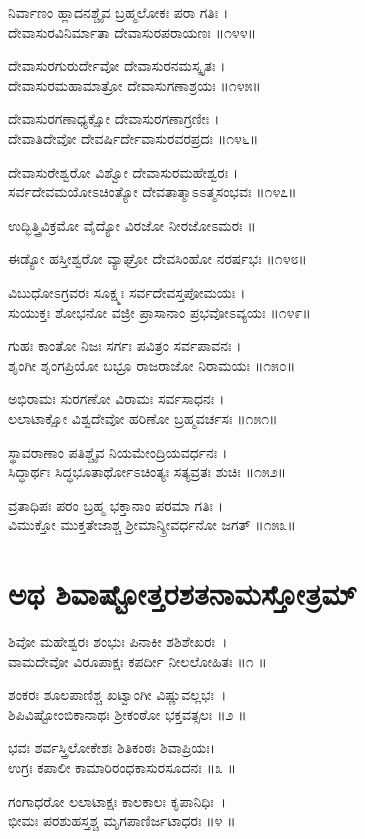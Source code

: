 ನಿರ್ವಾಣಂ ಹ್ಲಾದನಶ್ಚೈವ ಬ್ರಹ್ಮಲೋಕಃ ಪರಾ ಗತಿಃ ।\\
ದೇವಾಸುರವಿನಿರ್ಮಾತಾ ದೇವಾಸುರಪರಾಯಣಃ ॥೧೪೪॥

ದೇವಾಸುರಗುರುರ್ದೇವೋ ದೇವಾಸುರನಮಸ್ಕೃತಃ ।\\
ದೇವಾಸುರಮಹಾಮಾತ್ರೋ ದೇವಾಸುಗಣಾಶ್ರಯಃ ॥೧೪೫॥

ದೇವಾಸುರಗಣಾಧ್ಯಕ್ಷೋ ದೇವಾಸುರಗಣಾಗ್ರಣೀಃ ।\\
ದೇವಾತಿದೇವೋ ದೇವರ್ಷಿರ್ದೇವಾಸುರವರಪ್ರದಃ ॥೧೪೬॥

ದೇವಾಸುರೇಶ್ವರೋ ವಿಶ್ವೋ ದೇವಾಸುರಮಹೇಶ್ವರಃ ।\\
ಸರ್ವದೇವಮಯೋಽಚಿಂತ್ಯೋ ದೇವತಾತ್ಮಾಽಽತ್ಮಸಂಭವಃ ॥೧೪೭॥

ಉದ್ಭಿತ್ತ್ರಿವಿಕ್ರಮೋ ವೈದ್ಯೋ ವಿರಜೋ ನೀರಜೋಽಮರಃ ॥

ಈಡ್ಯೋ ಹಸ್ತೀಶ್ವರೋ ವ್ಯಾಘ್ರೋ ದೇವಸಿಂಹೋ ನರರ್ಷಭಃ ॥೧೪೮॥

ವಿಬುಧೋಽಗ್ರವರಃ ಸೂಕ್ಷ್ಮಃ ಸರ್ವದೇವಸ್ತಪೋಮಯಃ ।\\
ಸುಯುಕ್ತಃ ಶೋಭನೋ ವಜ್ರೀ ಪ್ರಾಸಾನಾಂ ಪ್ರಭವೋಽವ್ಯಯಃ ॥೧೪೯॥

ಗುಹಃ ಕಾಂತೋ ನಿಜಃ ಸರ್ಗಃ ಪವಿತ್ರಂ ಸರ್ವಪಾವನಃ ।\\
ಶೃಂಗೀ ಶೃಂಗಪ್ರಿಯೋ ಬಭ್ರೂ ರಾಜರಾಜೋ ನಿರಾಮಯಃ ॥೧೫೦॥

ಅಭಿರಾಮಃ ಸುರಗಣೋ ವಿರಾಮಃ ಸರ್ವಸಾಧನಃ ।\\
ಲಲಾಟಾಕ್ಷೋ ವಿಶ್ವದೇವೋ ಹರಿಣೋ ಬ್ರಹ್ಮವರ್ಚಸಃ ॥೧೫೧॥

ಸ್ಥಾವರಾಣಾಂ ಪತಿಶ್ಚೈವ ನಿಯಮೇಂದ್ರಿಯವರ್ಧನಃ ।\\
ಸಿದ್ಧಾರ್ಥಃ ಸಿದ್ಧಭೂತಾರ್ಥೋಽಚಿಂತ್ಯಃ ಸತ್ಯವ್ರತಃ ಶುಚಿಃ ॥೧೫೨॥

ವ್ರತಾಧಿಪಃ ಪರಂ ಬ್ರಹ್ಮ ಭಕ್ತಾನಾಂ ಪರಮಾ ಗತಿಃ ।\\
ವಿಮುಕ್ತೋ ಮುಕ್ತತೇಜಾಶ್ಚ ಶ್ರೀಮಾನ್ಶ್ರೀವರ್ಧನೋ ಜಗತ್ ॥೧೫೩॥
\section{ಅಥ ಶಿವಾಷ್ಟೋತ್ತರಶತನಾಮಸ್ತೋತ್ರಮ್ }
ಶಿವೋ ಮಹೇಶ್ವರಃ ಶಂಭುಃ ಪಿನಾಕೀ ಶಶಿಶೇಖರಃ~।\\
ವಾಮದೇವೋ ವಿರೂಪಾಕ್ಷಃ ಕಪರ್ದೀ ನೀಲಲೋಹಿತಃ ॥೧ ॥

ಶಂಕರಃ ಶೂಲಪಾಣಿಶ್ಚ ಖಟ್ವಾಂಗೀ ವಿಷ್ಣುವಲ್ಲಭಃ~।\\
ಶಿಪಿವಿಷ್ಟೋಂಬಿಕಾನಾಥಃ ಶ್ರೀಕಂಠೋ ಭಕ್ತವತ್ಸಲಃ ॥೨ ॥

ಭವಃ ಶರ್ವಸ್ತ್ರಿಲೋಕೇಶಃ ಶಿತಿಕಂಠಃ ಶಿವಾಪ್ರಿಯಃ।\\
ಉಗ್ರಃ ಕಪಾಲೀ ಕಾಮಾರಿರಂಧಕಾಸುರಸೂದನಃ ॥೩ ॥

ಗಂಗಾಧರೋ ಲಲಾಟಾಕ್ಷಃ ಕಾಲಕಾಲಃ ಕೃಪಾನಿಧಿಃ~।\\
ಭೀಮಃ ಪರಶುಹಸ್ತಶ್ಚ ಮೃಗಪಾಣಿರ್ಜಟಾಧರಃ ॥೪ ॥

